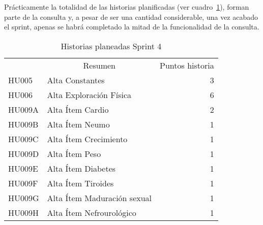 Prácticamente la totalidad de las historias planificadas (ver cuadro~\ref{historiasSprint4}), forman parte de la consulta y, a pesar de ser una cantidad considerable, una vez acabado el sprint, apenas se habrá completado la mitad de la funcionalidad de la consulta.

\begin{table}[!h]
\centering
\caption{Historias planeadas Sprint 4}
\label{historiasSprint4}
\begin{tabular}{llr}
\rowcolor[HTML]{C0C0C0} 
\multicolumn{1}{c}{\cellcolor[HTML]{C0C0C0}Identificador} & \multicolumn{1}{c}{\cellcolor[HTML]{C0C0C0}Resumen} & \multicolumn{1}{c}{\cellcolor[HTML]{C0C0C0}Puntos historia} \\
HU005                                                      & Alta Constantes									& 3                                                          \\
\rowcolor[HTML]{EFEFEF} 
HU006                                                      & Alta Exploración Física							& 6                                                           \\
HU009A                                                     & Alta Ítem Cardio									& 2                                                           \\
\rowcolor[HTML]{EFEFEF} 
HU009B                                                     & Alta Ítem Neumo									& 1                                                          
\\
HU009C                                                     & Alta Ítem Crecimiento								& 1                                                          
\\
\rowcolor[HTML]{EFEFEF} 
HU009D                                                     & Alta Ítem Peso										& 1
\\
HU009E                                                     & Alta Ítem Diabetes									& 1
\\
\rowcolor[HTML]{EFEFEF} 
HU009F                                                     & Alta Ítem Tiroides									& 1                                                          
\\
HU009G                                                     & Alta Ítem Maduración sexual						& 1                                                          
\\
\rowcolor[HTML]{EFEFEF} 
HU009H                                                     & Alta Ítem Nefrourológico							& 1
\\

\end{tabular}
\end{table}
